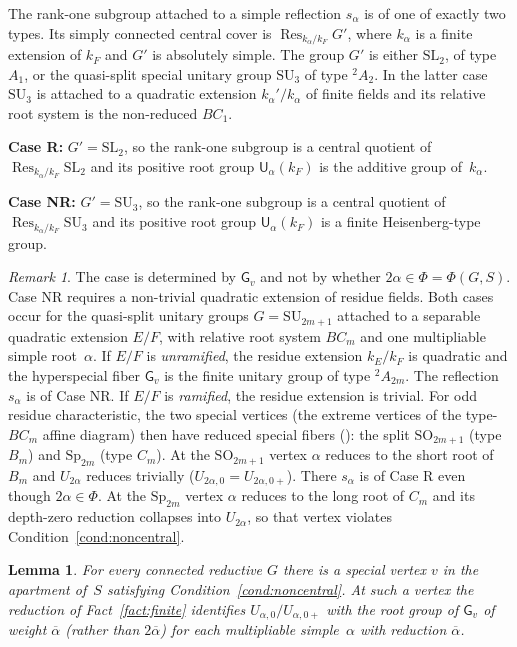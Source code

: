 \documentclass[11pt]{amsart}
\newtheorem{lemma}[theorem]{Lemma}
\theoremstyle{definition}
\theoremstyle{remark}
\newtheorem{remark}[theorem]{Remark}
\DeclareMathOperator{\Res}{Res}
\newcommand{\barr}[1]{\overline{#1}}
\begin{document}
The rank-one subgroup attached to a simple reflection $s_\alpha$ is of one of exactly two types. Its simply connected central cover is $\Res_{k_\alpha/k_F}G'$, where $k_\alpha$ is a finite extension of $k_F$ and $G'$ is absolutely simple. The group $G'$ is either $\mathrm{SL}_2$, of type $A_1$, or the quasi-split special unitary group $\mathrm{SU}_3$ of type ${}^2A_2$. In the latter case $\mathrm{SU}_3$ is attached to a quadratic extension $k_\alpha'/k_\alpha$ of finite fields and its relative root system is the non-reduced $BC_1$.

\smallskip
\noindent\textbf{Case R:} $G' = \mathrm{SL}_2$, so the rank-one subgroup is a central quotient of $\Res_{k_\alpha/k_F}\mathrm{SL}_2$ and its positive root group $\mathsf{U}_\alpha(k_F)$ is the additive group of~$k_\alpha$.

\smallskip
\noindent\textbf{Case NR:} $G' = \mathrm{SU}_3$, so the rank-one subgroup is a central quotient of $\Res_{k_\alpha/k_F}\mathrm{SU}_3$ and its positive root group $\mathsf{U}_\alpha(k_F)$ is a finite Heisenberg-type group.

\begin{remark}\label{rem:ramified}
The case is determined by $\mathsf{G}_v$ and not by whether $2\alpha \in \Phi = \Phi(G, S)$. Case NR requires a non-trivial quadratic extension of residue fields. Both cases occur for the quasi-split unitary groups $G = \mathrm{SU}_{2m+1}$ attached to a separable quadratic extension $E/F$, with relative root system $BC_m$ and one multipliable simple root~$\alpha$. If $E/F$ is \emph{unramified}, the residue extension $k_E/k_F$ is quadratic and the hyperspecial fiber $\mathsf{G}_v$ is the finite unitary group of type ${}^2A_{2m}$. The reflection $s_\alpha$ is of Case NR. If $E/F$ is \emph{ramified}, the residue extension is trivial. For odd residue characteristic, the two special vertices (the extreme vertices of the type-$BC_m$ affine diagram) then have reduced special fibers (\cite[Ex.~15.2.26]{KP}): the split $\mathrm{SO}_{2m+1}$ (type $B_m$) and $\mathrm{Sp}_{2m}$ (type $C_m$). At the $\mathrm{SO}_{2m+1}$ vertex $\alpha$ reduces to the short root of $B_m$ and $U_{2\alpha}$ reduces trivially ($U_{2\alpha,0} = U_{2\alpha,0+}$). There $s_\alpha$ is of Case R even though $2\alpha \in \Phi$. At the $\mathrm{Sp}_{2m}$ vertex $\alpha$ reduces to the long root of $C_m$ and its depth-zero reduction collapses into $U_{2\alpha}$, so that vertex violates Condition~\ref{cond:noncentral}.
\end{remark}

\begin{lemma}\label{lem:vertex}
For every connected reductive $G$ there is a special vertex $v$ in the apartment of~$S$ satisfying Condition~\ref{cond:noncentral}.  At such a vertex the reduction of Fact~\ref{fact:finite} identifies $U_{\alpha,0}/U_{\alpha,0+}$ with the root group of $\mathsf{G}_v$ of weight $\barr{\alpha}$ (rather than $2\barr{\alpha}$) for each multipliable simple~$\alpha$ with reduction $\barr{\alpha}$.
\end{lemma}
\end{document}
